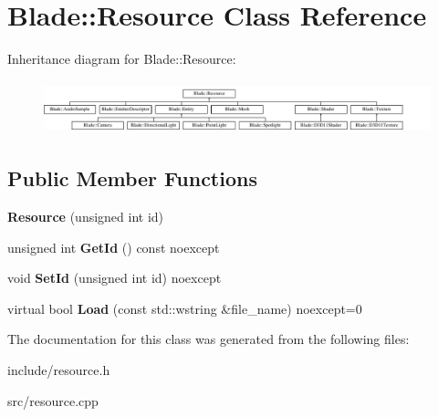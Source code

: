 \hypertarget{class_blade_1_1_resource}{}\section{Blade\+:\+:Resource Class Reference}
\label{class_blade_1_1_resource}
Inheritance diagram for Blade\+:\+:Resource\+:\begin{figure}[H]
\begin{center}
\leavevmode
\includegraphics[height=1.548387cm]{class_blade_1_1_resource}
\end{center}
\end{figure}
\subsection*{Public Member Functions}
\begin{DoxyCompactItemize}
\item 
\mbox{\label{class_blade_1_1_resource_aad67c68d5164726a1029c534fe7d003b}} 
{\bfseries Resource} (unsigned int id)
\item 
\mbox{\label{class_blade_1_1_resource_a2346c235601b0a703287bff9ad2c3432}} 
unsigned int {\bfseries Get\+Id} () const noexcept
\item 
\mbox{\label{class_blade_1_1_resource_a76912ec0d2dfb35a5fffc7364b8a867d}} 
void {\bfseries Set\+Id} (unsigned int id) noexcept
\item 
\mbox{\label{class_blade_1_1_resource_ad89ab00a3b81df1338a8310ec92c5cff}} 
virtual bool {\bfseries Load} (const std\+::wstring \&file\+\_\+name) noexcept=0
\end{DoxyCompactItemize}


The documentation for this class was generated from the following files\+:\begin{DoxyCompactItemize}
\item 
include/resource.\+h\item 
src/resource.\+cpp\end{DoxyCompactItemize}
